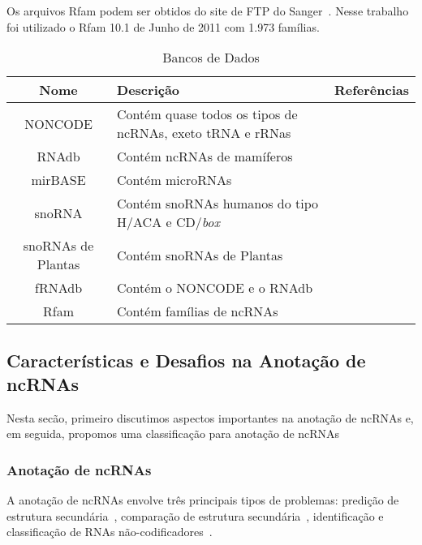 Os arquivos Rfam podem ser obtidos do site de FTP do Sanger~\citep{Rfam:2012}. Nesse trabalho foi utilizado o Rfam 10.1 de Junho de 2011 com 1.973 famílias.


\begin{table}[ht]
 \caption{Bancos de Dados} \label{fig:FerrRNAs}\begin{tabular}{|c|l|l|}
\hline
\textbf{Nome} &  \textbf{Descrição}   & \textbf{Referências}\\ \hline
NONCODE & Contém quase todos os tipos de ncRNAs, exeto tRNA e rRNas &~\citep{NONCODE:2012}\\ \hline
RNAdb & Contém ncRNAs de mamíferos &~\citep{RNAdb:2012}\\ \hline
mirBASE & Contém microRNAs&~\citep{miRBase:2012}\\ \hline
snoRNA & Contém snoRNAs humanos do tipo H/ACA e CD/\textit{box} &~\citep{snoRNAbase:2012}\\ \hline
snoRNAs de Plantas & Contém snoRNAs de Plantas &~\citep{PlantsnoRNA:2012}\\ \hline
fRNAdb & Contém o NONCODE e o RNAdb&~\citep{mituyama2009functional:2009} \\ \hline
Rfam & Contém famílias de ncRNAs &~\citep{Rfam:2012}\\ \hline
\end{tabular}
\label{}
\end{table} 


\subsection{Características e Desafios na Anotação de ncRNAs} \label{sec:CaracDesafDetec}

Nesta secão, primeiro discutimos aspectos importantes na anotação de ncRNAs e, em seguida, propomos uma classificação para anotação de ncRNAs



\subsubsection{Anotação de ncRNAs} \label{sec:Anotacao}

A anotação de ncRNAs envolve três principais tipos de problemas: predição de estrutura secundária~\citep{james:1989,hofacker2002secondary:2002,griffiths2007annotating:2007}, comparação de estrutura secundária~\citep{hofacker1994fast:1994,eddy2001non:2001}, identificação e classificação de RNAs não-codificadores~\citep{griffiths2007annotating:2007}.


